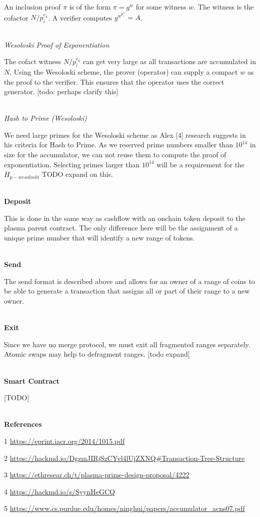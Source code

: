\documentclass[12pt]{article}
\begin{document}
An inclusion proof $\pi$ is of the form $\pi = g^w$ for some witness $w$. The witness is the cofactor $N/p_i^{e_k}$. A verifier computes $g^{w^{p_i^{e_i}}} = A$.
\\
\\
\centerline{\textit{Wesoloski Proof of Exponentiation}}

The cofact witness $N/p_i^{e_k}$ can get very large as all transactions are accumulated in $N$. Using the Wesoloski scheme, the prover (operator) can supply a compact $w$ as the proof to the verifier. This ensures that the operator uses the correct generator. [todo: perhaps clarify this]
\\
\\
\centerline{\textit{Hash to Prime (Wesoloski)}}

We need large primes for the Wesoloski scheme as Alex [4] research suggests in his criteria for Hash to Prime. As we reserved prime numbers smaller than $10^14$ in size for the accumulator, we can not reuse them to compute the proof of exponentiation. Selecting primes larger than $10^14$ will be a requirement for the $H_{p-wesoloski}$ TODO expand on this. 
\\ 
\\
\centerline{\textbf{Deposit}}

This is done in the same way as cashflow with an onchain token deposit to the plasma parent contract. The only difference here will be the assignment of a unique prime number that will identify a new range of tokens. 
\\
\\
\centerline{\textbf{Send}}

The send format is described above and allows for an owner of a range of coins to be able to generate a transaction that assigns all or part of their range to a new owner. 
\\
\\
\centerline{\textbf{Exit}}

Since we have no merge protocol, we must exit all fragmented ranges separately. Atomic swaps may help to defragment ranges. [todo expand]
\\
\\
\centerline{\textbf{Smart Contract}}

[TODO]
\\
\\
\centerline{\textbf{References}}

1 \url{https://eprint.iacr.org/2014/1015.pdf}

2 \url{https://hackmd.io/DgzmJIRjSzCYvl4lUjZXNQ#Transaction-Tree-Structure}

3 \url{https://ethresear.ch/t/plasma-prime-design-proposal/4222}

4 \url{https://hackmd.io/s/SyynHeGCQ}

5 \url{https://www.cs.purdue.edu/homes/ninghui/papers/accumulator_acns07.pdf}
\end{document}
